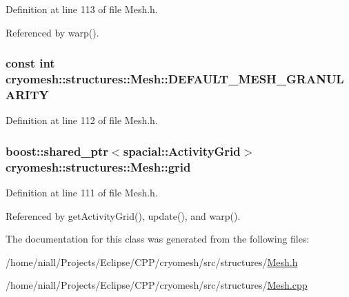 \-Definition at line 113 of file \-Mesh.\-h.



\-Referenced by warp().

\hypertarget{classcryomesh_1_1structures_1_1Mesh_a3a748cc09c8a337d6cb4087a44255ece}{
\subsubsection[{\-D\-E\-F\-A\-U\-L\-T\-\_\-\-M\-E\-S\-H\-\_\-\-G\-R\-A\-N\-U\-L\-A\-R\-I\-T\-Y}]{\setlength{\rightskip}{0pt plus 5cm}const int {\bf cryomesh\-::structures\-::\-Mesh\-::\-D\-E\-F\-A\-U\-L\-T\-\_\-\-M\-E\-S\-H\-\_\-\-G\-R\-A\-N\-U\-L\-A\-R\-I\-T\-Y}}}\label{classcryomesh_1_1structures_1_1Mesh_a3a748cc09c8a337d6cb4087a44255ece}


\-Definition at line 112 of file \-Mesh.\-h.

\hypertarget{classcryomesh_1_1structures_1_1Mesh_a6a93097e85b79b2b5073d1a580ffea25}{
\subsubsection[{grid}]{\setlength{\rightskip}{0pt plus 5cm}boost\-::shared\-\_\-ptr$<$spacial\-::\-Activity\-Grid$>$ {\bf cryomesh\-::structures\-::\-Mesh\-::grid}}}\label{classcryomesh_1_1structures_1_1Mesh_a6a93097e85b79b2b5073d1a580ffea25}


\-Definition at line 111 of file \-Mesh.\-h.



\-Referenced by get\-Activity\-Grid(), update(), and warp().



\-The documentation for this class was generated from the following files\-:\begin{DoxyCompactItemize}
\item 
/home/niall/\-Projects/\-Eclipse/\-C\-P\-P/cryomesh/src/structures/\hyperlink{Mesh_8h}{\-Mesh.\-h}\item 
/home/niall/\-Projects/\-Eclipse/\-C\-P\-P/cryomesh/src/structures/\hyperlink{Mesh_8cpp}{\-Mesh.\-cpp}\end{DoxyCompactItemize}
